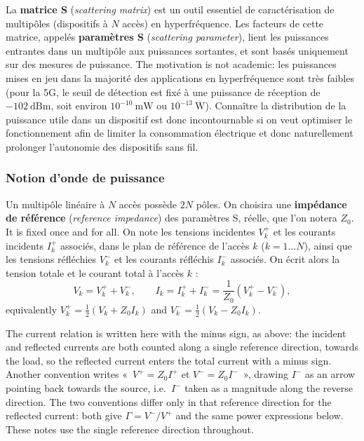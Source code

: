 La \textbf{matrice S} (\textit{scattering matrix}) est un outil essentiel de
caractérisation de multipôles (dispositifs à $N$ accès) en hyperfréquence. Les facteurs de cette matrice, appelés \textbf{paramètres
S} (\textit{scattering parameter}), lient les puissances entrantes dans un multipôle
aux puissances sortantes, et sont basés uniquement sur des mesures de puissance. The
motivation is not academic: les puissances mises en jeu dans la majorité des
applications en hyperfréquence sont très faibles (pour la 5G, le seuil de détection
est fixé à une puissance de réception de $-102\ \mathrm{dBm}$, soit environ
$10^{-10}\ \mathrm{mW}$ ou $10^{-13}\ \mathrm{W}$). Connaître la distribution de la
puissance utile dans un dispositif est donc incontournable si on veut optimiser le
fonctionnement afin de limiter la consommation électrique et donc naturellement
prolonger l'autonomie des dispositifs sans fil.

\subsubsection{Notion d'onde de puissance}
Un multipôle linéaire à $N$ accès possède $2N$ pôles. On choisira une
\textbf{impédance de référence} (\textit{reference impedance}) des paramètres S,
réelle, que l'on notera $Z_0$. It is fixed once and for all. On note les tensions
incidentes $V_k^{+}$ et les courants incidents $I_k^{+}$ associés, dans le plan de
référence de l'accès $k$ ($k = 1 \dots N$), ainsi que les tensions réfléchies $V_k^{-}$
et les courants réfléchis $I_k^{-}$ associés. On écrit alors la tension totale et le
courant total à l'accès $k$ :
\[V_k = V_k^{+} + V_k^{-},
  \qquad I_k = I_k^{+} + I_k^{-} = \frac{1}{Z_0}\left(V_k^{+} - V_k^{-}\right),\]
equivalently $V_k^{+} = \tfrac{1}{2}(V_k + Z_0 I_k)$ and
$V_k^{-} = \tfrac{1}{2}(V_k - Z_0 I_k)$.

\begin{remark}
  The current relation is written here with the minus sign, as above: the incident and
  reflected currents are both counted along a single reference direction, towards the
  load, so the reflected current enters the total current with a minus sign. Another
  convention writes «~$V^{+} = Z_0 I^{+}$ et $V^{-} = Z_0 I^{-}$~», drawing
  $I^{-}$ as an arrow pointing back towards the source, i.e.\ $I^{-}$ taken as a
  magnitude along the reverse direction. The two conventions differ only in that
  reference direction for the reflected current: both give $\Gamma = V^{-}/V^{+}$ and
  the same power expressions below. These notes use the single reference direction
  throughout.
\end{remark}

